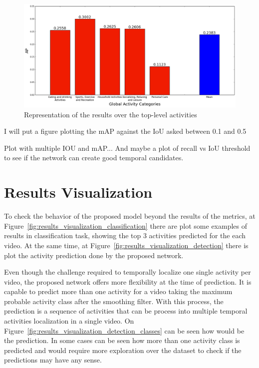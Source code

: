 \begin{figure}[H]
\begin{center}
\includegraphics[width=1\linewidth]{img/results/top_activities_detection_ap}
\end{center}
\caption{Representation of the results over the top-level activities}
\label{fig:top_level_detection_ap}
\end{figure}


I will put a figure plotting the mAP against the IoU asked between 0.1 and 0.5

Plot with multiple IOU and mAP... And maybe a plot of recall vs IoU threshold to see if the network can create good temporal candidates. 

\section{Results Visualization}

To check the behavior of the proposed model beyond the results of the metrics, at Figure~\ref{fig:results_visualization_classification} there are plot some examples of results in classification task, showing the top 3 activities predicted for the each video. At the same time, at Figure~\ref{fig:results_visualization_detection} there is plot the activity prediction done by the proposed network.

Even though the challenge required to temporally localize one single activity per video, the proposed network offers more flexibility at the time of prediction. It is capable to predict more than one activity for a video taking the maximum probable activity class after the smoothing filter. With this process, the prediction is a sequence of activities that can be process into multiple temporal activities localization in a single video. On Figure~\ref{fig:results_visualization_detection_classes} can be seen how would be the prediction. In some cases can be seen how more than one activity class is predicted and would require more exploration over the dataset to check if the predictions may have any sense.

